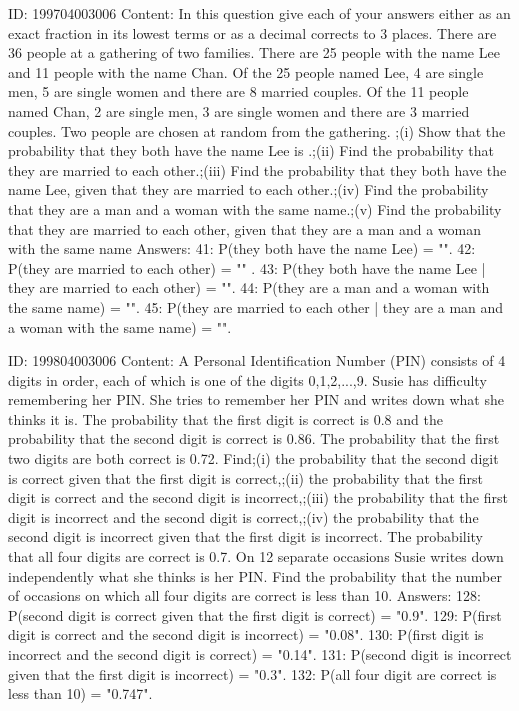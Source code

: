 \documentclass{article}
\begin{document}
ID: 199704003006
Content:
In this question give each of your answers either as an exact fraction in its lowest terms or as a decimal corrects to 3 places.  There are 36 people at a gathering of two families. There are 25 people with the name Lee and 11 people with the name Chan. Of the 25 people named Lee, 4 are single men, 5 are single women and there are 8 married couples. Of the 11 people named Chan, 2 are single men, 3 are single women and there are 3 married couples. Two people are chosen at random from the gathering. ;(i) Show that the probability that they both have the name Lee is  .;(ii) Find the probability that they are married to each other.;(iii) Find the probability that they both have the name Lee, given that they are married to each other.;(iv) Find the probability that they are a man and a woman with the same name.;(v) Find the probability that they are married to each other, given that they are a man and a woman with the same name Answers:
41: P(they both have the name Lee) = "".
42: P(they are married to each other) = "" .
43: P(they both have the name Lee | they are married to each other) = "".
44: P(they are a man and a woman with the same name) = "".
45: P(they are married to each other | they are a man and a woman with the same name) = "".

ID: 199804003006
Content:
A Personal Identification Number (PIN) consists of 4 digits in order, each of which is one of the digits 0,1,2,...,9. Susie has difficulty remembering her PIN. She tries to remember her PIN and writes down what she thinks it is. The probability that the first digit is correct is 0.8 and the probability that the second digit is correct is 0.86. The probability that the first two digits are both correct is 0.72. Find;(i) the probability that the second digit is correct given that the first digit is correct,;(ii) the probability that the first digit is correct and the second digit is incorrect,;(iii) the probability that the first digit is incorrect and the second digit is correct,;(iv) the probability that the second digit is incorrect given that the first digit is incorrect. The probability that all four digits are correct is 0.7. On 12 separate occasions Susie writes down independently what she thinks is her PIN. Find the probability that the number of occasions on which all four digits are correct is less than 10.  Answers:
128: P(second digit is correct given that the first digit is correct) = "0.9".
129: P(first digit is correct and the second digit is incorrect) = "0.08".
130: P(first digit is incorrect and the second digit is correct) = "0.14".
131: P(second digit is incorrect given that the first digit is incorrect) = "0.3".
132: P(all four digit are correct is less than 10) = "0.747".
\end{document}
